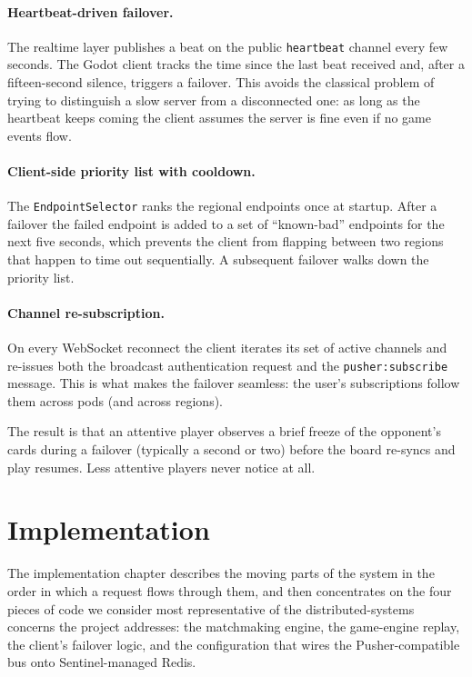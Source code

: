 \documentclass{scrartcl}
\begin{document}
\paragraph{Heartbeat-driven failover.} The realtime layer publishes a
beat on the public \texttt{heartbeat} channel every few seconds. The
Godot client tracks the time since the last beat received and, after
a fifteen-second silence, triggers a failover. This avoids the
classical problem of trying to distinguish a slow server from a
disconnected one: as long as the heartbeat keeps coming the client
assumes the server is fine even if no game events flow.

\paragraph{Client-side priority list with cooldown.} The
\texttt{EndpointSelector} ranks the regional endpoints once at
startup. After a failover the failed endpoint is added to a set of
``known-bad'' endpoints for the next five seconds, which prevents the
client from flapping between two regions that happen to time out
sequentially. A subsequent failover walks down the priority list.

\paragraph{Channel re-subscription.} On every WebSocket reconnect the
client iterates its set of active channels and re-issues both the
broadcast authentication request and the \texttt{pusher:subscribe}
message. This is what makes the failover seamless: the user's
subscriptions follow them across pods (and across regions).

The result is that an attentive player observes a brief freeze of the
opponent's cards during a failover (typically a second or two) before
the board re-syncs and play resumes. Less attentive players never
notice at all.


\section{Implementation}\label{implementation}

The implementation chapter describes the moving parts of the system in
the order in which a request flows through them, and then concentrates
on the four pieces of code we consider most representative of the
distributed-systems concerns the project addresses: the matchmaking
engine, the game-engine replay, the client's failover logic, and the
configuration that wires the Pusher-compatible bus onto Sentinel-managed
Redis.
\end{document}
